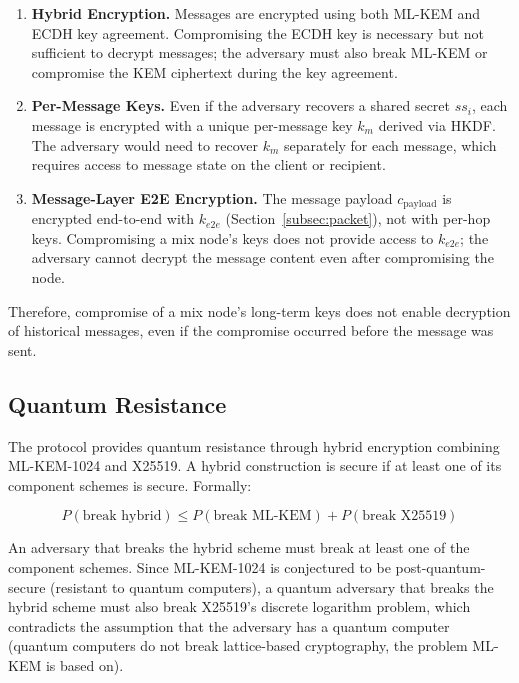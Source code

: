 \documentclass[11pt]{article}
\theoremstyle{definition}
\theoremstyle{remark}
\begin{document}
\begin{enumerate}
    \item \textbf{Hybrid Encryption.} Messages are encrypted using both ML-KEM and ECDH key agreement. Compromising the ECDH key is necessary but not sufficient to decrypt messages; the adversary must also break ML-KEM or compromise the KEM ciphertext during the key agreement.

    \item \textbf{Per-Message Keys.} Even if the adversary recovers a shared secret $ss_i$, each message is encrypted with a unique per-message key $k_m$ derived via HKDF. The adversary would need to recover $k_m$ separately for each message, which requires access to message state on the client or recipient.

    \item \textbf{Message-Layer E2E Encryption.} The message payload $c_{\text{payload}}$ is encrypted end-to-end with $k_{e2e}$ (Section~\ref{subsec:packet}), not with per-hop keys. Compromising a mix node's keys does not provide access to $k_{e2e}$; the adversary cannot decrypt the message content even after compromising the node.
\end{enumerate}

Therefore, compromise of a mix node's long-term keys does not enable decryption of historical messages, even if the compromise occurred before the message was sent.

\subsection{Quantum Resistance}
\label{subsec:pq-resist}

The protocol provides quantum resistance through hybrid encryption combining ML-KEM-1024 and X25519. A hybrid construction is secure if at least one of its component schemes is secure. Formally:

\begin{equation}
P(\text{break hybrid}) \leq P(\text{break ML-KEM}) + P(\text{break X25519})
\label{eq:pq-hybrid}
\end{equation}

An adversary that breaks the hybrid scheme must break at least one of the component schemes. Since ML-KEM-1024 is conjectured to be post-quantum-secure (resistant to quantum computers), a quantum adversary that breaks the hybrid scheme must also break X25519's discrete logarithm problem, which contradicts the assumption that the adversary has a quantum computer (quantum computers do not break lattice-based cryptography, the problem ML-KEM is based on).
\end{document}
